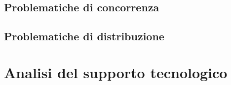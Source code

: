 \documentclass[a4paper]{article}
\begin{document}
\subsection{Problematiche di concorrenza}

\subsection{Problematiche di distribuzione}


\section{Analisi del supporto tecnologico}

\appendix

%
\end{document}

